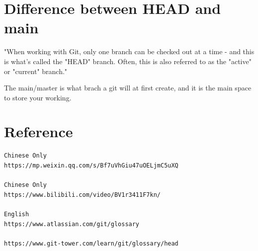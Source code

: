 \documentclass[UTF8]{article}
\begin{document}
\section{Difference between HEAD and main}
"When working with Git, only one branch can be checked out at a time - and this is what's called the "HEAD" branch. Often, this is also referred to as the "active" or "current" branch."

The main/master is what brach a git will at first create, and it is the main space to store your working. 


\section{Reference}
\begin{verbatim}
Chinese Only
https://mp.weixin.qq.com/s/Bf7uVhGiu47uOELjmC5uXQ 

Chinese Only
https://www.bilibili.com/video/BV1r3411F7kn/

English
https://www.atlassian.com/git/glossary 

https://www.git-tower.com/learn/git/glossary/head 


\end{verbatim}
\end{document}
